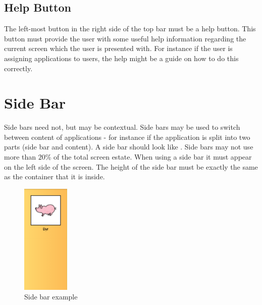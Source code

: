 \subsection{Help Button}
\label{sec:help_button}
The left-most button in the right side of the top bar must be a help button. This button must provide the user with some useful help information regarding the current screen which the user is presented with. For instance if the user is assigning applications to users, the help might be a guide on how to do this correctly.

\FloatBarrier


\section{Side Bar}

Side bars need not, but may be contextual. Side bars may be used to switch between content of applications - for instance if the application is split into two parts (side bar and content). A side bar should look like . Side bars may not use more than $20\%$ of the total screen estate. When using a side bar it must appear on the left side of the screen. The height of the side bar must be exactly the same as the container that it is inside.


\begin{note}
\end{note}

\begin{figure}[!htbp]
        \centering
        \includegraphics[width=0.20\textwidth]{pictures/application_structure/sidebar}
        \caption{Side bar example}
        \label{fig:side_bar_example}
\end{figure}


